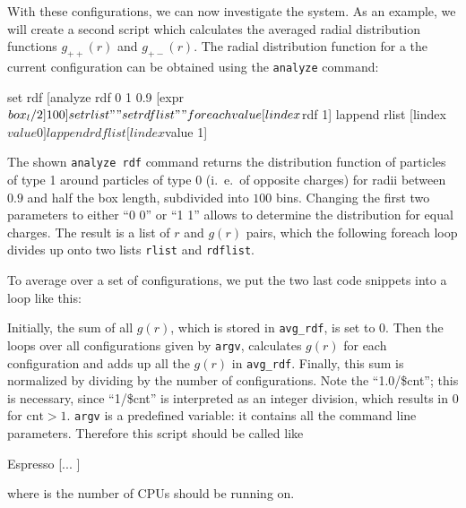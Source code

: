 With these configurations, we can now investigate the system. As an example, we
will create a second script which calculates the averaged radial distribution
functions $g_{++}(r)$ and $g_{+-}(r)$. The radial distribution function for a
the current configuration can be obtained using the \verb|analyze| command:
\begin{tclcode}
set rdf [analyze rdf 0 1 0.9 [expr $box_l/2] 100]
set rlist ""
set rdflist ""
foreach value [lindex $rdf 1] {
  lappend rlist   [lindex $value 0]
  lappend rdflist [lindex $value 1] 
}
\end{tclcode}
The shown \verb|analyze rdf| command returns the distribution function of
particles of type 1 around particles of type 0 (i.~e.\ of opposite charges) for
radii between $0.9$ and half the box length, subdivided into $100$ bins.
Changing the first two parameters to either ``0 0'' or ``1 1'' allows to
determine the distribution for equal charges. The result is a list of $r$ and
$g(r)$ pairs, which the following foreach loop divides up onto two lists
\verb|rlist| and \verb|rdflist|.

To average over a set of configurations, we put the two last code snippets into
a loop like this:
Initially, the sum of all $g(r)$, which is stored in \verb|avg_rdf|, is set to
0.  Then the loops over all configurations given by \verb|argv|, calculates
$g(r)$ for each configuration and adds up all the $g(r)$ in \verb|avg_rdf|.
Finally, this sum is normalized by dividing by the number of
configurations. Note the ``1.0/\$cnt''; this is necessary, since ``1/\$cnt'' is
interpreted as an integer division, which results in 0 for $\text{cnt}>1$.
\verb|argv| is a predefined variable: it contains all the command line
parameters. Therefore this script should be called like
\begin{code}
Espresso   [... ]
\end{code}
where  is the number of CPUs \es should be running on.


